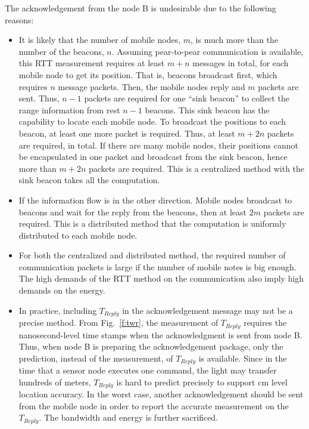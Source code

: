 The acknowledgement from the node B is undesirable due to the following reasons:
\begin{itemize}
\item It is likely that the number of mobile nodes, $m$, is much more than the number of the beacons, $n$. Assuming pear-to-pear communication is available, this RTT measurement requires at least $m+n$ messages in total, for each mobile node to get its position. That is, beacons broadcast first, which requires $n$ message packets. Then, the mobile nodes reply and $m$ packets are sent. Thus, $n-1$ packets are required for one ``sink beacon'' to collect the range information from rest $n-1$ beacons. This sink beacon has the capability to locate each mobile node. To broadcast the positions to each beacon, at least one more packet is required. Thus, at least $m+2n$ packets are required, in total. If there are many mobile nodes, their positions cannot be encapsulated in one packet and broadcast from the sink beacon, hence more than $m+2n$ packets are required. This is a centralized method with the sink beacon takes all the computation.
\item  If the information flow is in the other direction. Mobile nodes broadcast to beacons and wait for the reply from the beacons, then at least $2m$ packets are required. This is a distributed method that the computation is uniformly distributed to each mobile node.
\item  For both the centralized and distributed method, the required number of communication packets is large if the number of mobile notes is big enough. The high demands of the RTT method on the communication also imply high demands on the energy.
\item  In practice, including $T_{Reply}$ in the acknowledgement message may not be a precise method. From Fig.~\ref{f:twr}, the measurement of $T_{Reply}$ requires the nanosecond-level time stamps when the acknowledgment is sent from node B. Thus, when node B is preparing the acknowledgement package, only the prediction, instead of the measurement, of $T_{Reply}$ is available. Since in the time that a sensor node executes one command, the light may transfer hundreds of meters, $T_{Reply}$ is hard to predict precisely to support cm level location accuracy. In the worst case, another acknowledgement should be sent from the mobile node in order to report the accurate measurement on the $T_{Reply}$. The bandwidth and energy is further sacrificed. %

\end{itemize}
